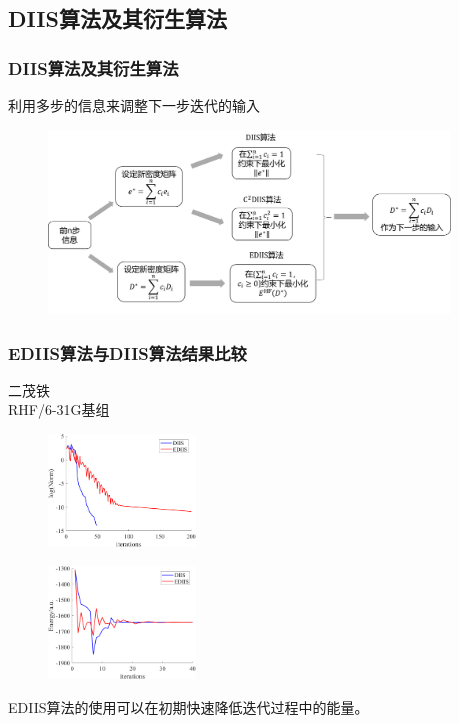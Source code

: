 \documentclass[10pt,aspectratio=43,mathserif,UTF8]{beamer}
\begin{document}
\subsection{DIIS算法及其衍生算法}
\begin{frame}
	\frametitle{DIIS算法及其衍生算法}
	利用多步的信息来调整下一步迭代的输入
	
	\begin{figure}[htbp]
		\centering
		\includegraphics[width=0.95\textwidth]{figure/HF/DIIS2.png}
	\end{figure}

\end{frame}



\begin{frame}
	\frametitle{EDIIS算法与DIIS算法结果比较}
	二茂铁\\
	RHF/6-31G基组

	\begin{figure}[ht!]
		\centering
		\begin{minipage}{0.4\linewidth}
			\centering
			\includegraphics[height=3cm]{figure/ferrocene/logNorm3.png}
			\label{fig:ferrocene:lognorm}
		\end{minipage}
		\begin{minipage}{0.4\linewidth}
			\centering
			\includegraphics[height=3cm]{figure/ferrocene/E3.png}
			\label{fig:ferrocene:E}
		\end{minipage}
		\label{fig:ferrocene}
	\end{figure}
	\centerline{EDIIS算法的使用可以在初期快速降低迭代过程中的能量。}
\end{frame}
\end{document}
